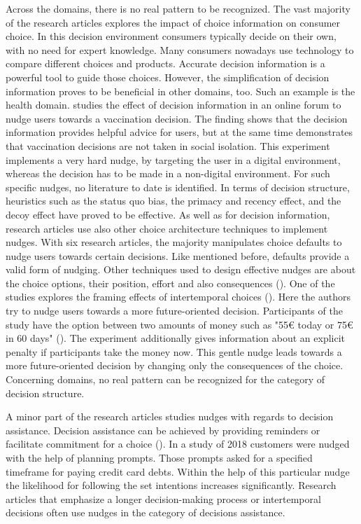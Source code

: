 Across the domains, there is no real pattern to be recognized. The vast majority of the research articles explores the impact of choice information on consumer choice. In this decision environment consumers typically decide on their own, with no need for expert knowledge. Many consumers nowadays use technology to compare different choices and products. Accurate decision information is a powerful tool to guide those choices. 
However, the simplification of decision information proves to be beneficial in other domains, too. Such an example is the health domain. \cite{langley_should_2015} studies the effect of decision information in an online forum to nudge users towards a vaccination decision. The finding shows that the decision information provides helpful advice for users, but at the same time demonstrates that vaccination decisions are not taken in social isolation. This experiment implements a very hard nudge, by targeting the user in a digital environment, whereas the decision has to be made in a non-digital environment. For such specific nudges, no literature to date is identified.
In terms of decision structure, heuristics such as the status quo bias, the primacy and recency effect, and the decoy effect have proved to be effective. As well as for decision information, research articles use also other choice architecture techniques to implement nudges. With six research articles, the majority manipulates choice defaults to nudge users towards certain decisions. Like mentioned before, defaults provide a valid form of nudging. Other techniques used to design effective nudges are about the choice options, their position, effort and also consequences (\cite{munscher_review_2016}). One of the studies explores the framing effects of intertemporal choices (\cite{faralla_framing_2017}). Here the authors try to nudge users towards a more future-oriented decision. Participants of the study have the option between two amounts of money such as "55€ today or 75€ in 60 days" (\cite[p.13]{faralla_framing_2017}). The experiment additionally gives information about an explicit penalty if participants take the money now. This gentle nudge leads towards a more future-oriented decision by changing only the consequences of the choice. Concerning domains, no real pattern can be recognized for the category of decision structure.

A minor part of the research articles studies nudges with regards to decision assistance. Decision assistance can be achieved by providing reminders or facilitate commitment for a choice (\cite{munscher_review_2016}). In a study of 2018 customers were nudged with the help of planning prompts. Those prompts asked for a specified timeframe for paying credit card debts. Within the help of this particular nudge the likelihood for following the set intentions increases significantly.
Research articles that emphasize a longer decision-making process or intertemporal decisions often use nudges in the category of decisions assistance.

